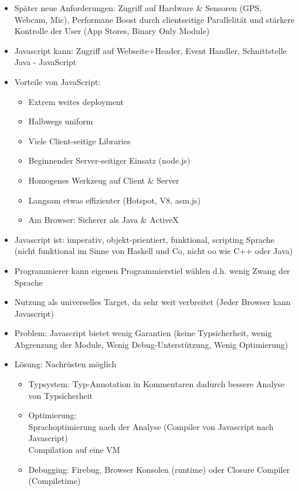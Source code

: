 \documentclass{article} %
\begin{document}
\begin{itemize}
		\item Später neue Anforderungen: Zugriff auf Hardware \& Sensoren (GPS, Webcam, Mic), Performane Boost durch clientseitige Parallelität und stärkere Kontrolle der User (App Stores, Binary Only Module)
		\item Javascript kann: Zugriff auf Webseite+Header, Event Handler, Schnittstelle Java - JavaScript
		\item Vorteile von JavaScript:
		\begin{itemize}
			\item Extrem weites deployment
			\item Halbwegs uniform 
			\item Viele Client-seitige Libraries
			\item Beginnender Server-seitiger Einsatz (node.js)
			\item Homogenes Werkzeug auf Client \& Server
			\item Langsam etwas effizienter (Hotspot, V8, asm.js)
			\item Am Browser: Sicherer als Java \& ActiveX 
		\end{itemize}
		\item Javascript ist: imperativ, objekt-prientiert, funktional, scripting Sprache (nicht funktional im Sinne von Haskell und Co, nicht oo wie C++ oder Java)
		\item Programmierer kann eigenen Programmierstiel wählen d.h. wenig Zwang der Sprache 
		\item Nutzung als universelles Target, da sehr weit verbreitet (Jeder Browser kann Javascript)
		\item Problem: Javascript bietet wenig Garantien (keine Typsicherheit, wenig Abgrenzung der Module, Wenig Debug-Unterstützung, Wenig Optimierung)
		\item Lösung: Nachrüsten möglich 
		\begin{itemize}
			\item Typsystem: Typ-Annotation in Kommentaren dadurch bessere Analyse von Typsicherheit
			\item Optimierung: \\
			Sprachoptimierung nach der Analyse (Compiler von Javascript nach Javascript)\\
			Compilation auf eine VM
			\item Debugging: Firebug, Browser Konsolen (runtime) oder Closure Compiler (Compiletime)
		\end{itemize}


\end{itemize}
\end{document}
